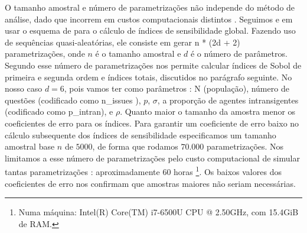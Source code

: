 O tamanho amostral e número de parametrizações não independe do método de
análise, dado que incorrem em custos computacionais distintos
\cite{saltelli2002making}. Seguimos  e
 em usar o esquema de
 para o cálculo de índices de sensibilidade
global. Fazendo uso de sequências quasi-aleatórias, ele consiste em gerar n *
(2d + 2) parametrizações, onde \(n\) é o tamanho amostral  e \(d\) é o
número de parâmetros. Segundo  esse número
de parametrizações nos permite calcular índices de Sobol de primeira e segunda
ordem e índices totais, discutidos no parágrafo seguinte. No nosso caso \(d =
6\), pois vamos ter como parâmetros : N (população), número de questões
(codificado como n\_issues ), \(p\), \(\sigma\), a proporção de agentes
intransigentes (codificado como p\_intran), e \(\rho\). Quanto maior o tamanho da
amostra  menor os coeficientes de erro para os índices. Para garantir um
coeficiente de erro baixo no cálculo subsequente dos índices de sensibilidade
especificamos um tamanho amostral base \(n\) de \(5000\), de forma que rodamos
\(70.000\) parametrizações. Nos limitamos a esse número de parametrizações pelo
custo computacional de simular tantas parametrizações : aproximadamente 60 horas
\footnote{Numa máquina: Intel(R) Core(TM) i7-6500U CPU @ 2.50GHz, com 15.4GiB de
  RAM.}. Os baixos valores dos coeficientes de erro nos confirmam que amostras
maiores não seriam necessárias.


